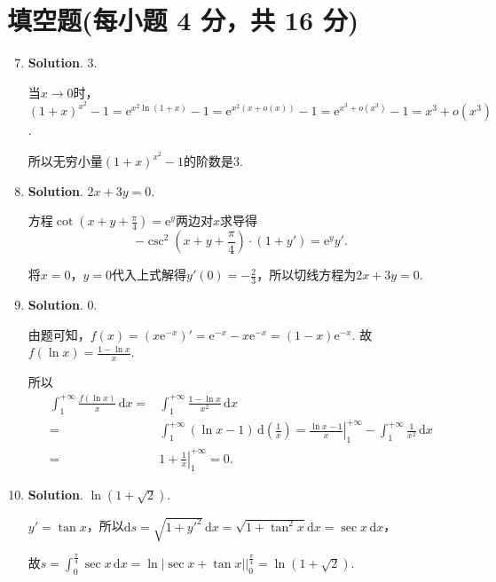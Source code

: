 \documentclass[../Main.tex]{subfiles}
\begin{document}
\section{填空题(每小题 4 分，共 16 分)}
\begin{enumerate}
    \setcounter{enumi}{6}
    \item \textbf{Solution}. $3$.

          当$x\to0$时，$\left(1+x\right)^{x^2}-1 = \mathrm{e}^{x^2\ln(1+x)}-1 = \mathrm{e}
              ^{x^2\left(x+o(x)\right)}-1= \mathrm{e}^{x^3+o(x^3)}-1 = x^{3}+o(x^{3})$.

          所以无穷小量$\left(1+x\right)^{x^2}-1$的阶数是$3$.

    \item \textbf{Solution}. $2x+3y=0$.

          方程$\cot\left(x+y+\frac{\pi}{4}\right)=\mathrm{e}^{y}$两边对$x$求导得
          \[
              -\csc^{2}\left(x+y+\frac{\pi}{4}\right)\cdot\left(1+y'\right)=\mathrm{e}^{y}
              y'.
          \]

          将$x=0$，$y=0$代入上式解得$y'(0)=-\frac{2}{3}$，所以切线方程为$2x+3y=0$.

    \item \textbf{Solution}. $0$.

          由题可知，$f(x)=\left(x\mathrm{e}^{-x}\right)'=\mathrm{e}^{-x}-x\mathrm{e}^{-x}
              =(1-x)\mathrm{e}^{-x}$. 故$f(\ln x)=\frac{1-\ln x}{x}$.

          所以
          \[
              \begin{aligned}
                  \int_{1}^{+\infty}\frac{f(\ln x)}{x}\,\mathrm{d}x = & \int_{1}^{+\infty}\frac{1-\ln x}{x^2}\,\mathrm{d}x                                                                                                                    \\
                  =                                                   & \int_{1}^{+\infty}\left(\ln x-1\right)\,\mathrm{d}\left(\frac{1}{x}\right)= \left.\frac{\ln x-1}{x}\right|_{1}^{+\infty}-\int_{1}^{+\infty}\frac{1}{x^2}\,\mathrm{d}x \\
                  =                                                   & 1+\left.\frac{1}{x}\right|_{1}^{+\infty}= 0.
              \end{aligned}
          \]

    \item \textbf{Solution}. $\ln\left(1+\sqrt{2}\right)$.

          $y'=\tan x$，所以$\mathrm{d}s=\sqrt{1+y'^{2}}\,\mathrm{d}x=\sqrt{1+\tan^{2} x}
              \mathrm{d}x=\sec x\,\mathrm{d}x$，

          故$s=\int_{0}^{\frac{\pi}{4}}\sec x\,\mathrm{d}x=\ln\left|\sec x+\tan x\right
              |\bigg|_{0}^{\frac{\pi}{4}}=\ln\left(1+\sqrt{2}\right)$.
\end{enumerate}
\end{document}
